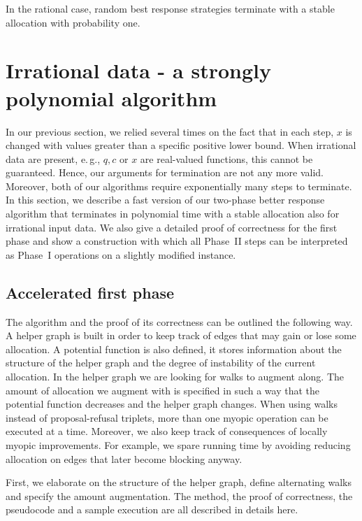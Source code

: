 \documentclass{llncs}
\newcommand{\eg}{{e.\,g.}}
\begin{document}
\begin{theorem}
	In the rational case, random best response strategies terminate with a stable allocation with probability one.
\end{theorem}

\section{Irrational data - a strongly polynomial algorithm}
\label{sec:irrat}

In our previous section, we relied several times on the fact that in each step, $x$ is changed with values greater than a specific positive lower bound. When irrational data are present, \eg, $q, c$ or $x$ are real-valued functions, this cannot be guaranteed. Hence, our arguments for termination are not any more valid. Moreover, both of our algorithms require exponentially many steps to terminate. In this section, we describe a fast version of our two-phase better response algorithm that terminates in polynomial time with a stable allocation also for irrational input data. We also give a detailed proof of correctness for the first phase and show a construction with which all Phase~II steps can be interpreted as Phase~I operations on a slightly modified instance.

\subsection{Accelerated first phase}

The algorithm and the proof of its correctness can be outlined the following way. A helper graph is built in order to keep track of edges that may gain or lose some allocation. A potential function is also defined, it stores information about the structure of the helper graph and the degree of instability of the current allocation. In the helper graph we are looking for walks to augment along. The amount of allocation we augment with is specified in such a way that the potential function decreases and the helper graph changes. When using walks instead of proposal-refusal triplets, more than one myopic operation can be executed at a time. Moreover, we also keep track of consequences of locally myopic improvements. For example, we spare running time by avoiding reducing allocation on edges that later become blocking anyway.

First, we elaborate on the structure of the helper graph, define alternating walks and specify the amount augmentation. The method, the proof of correctness, the pseudocode and a sample execution are all described in details here.
\end{document}
